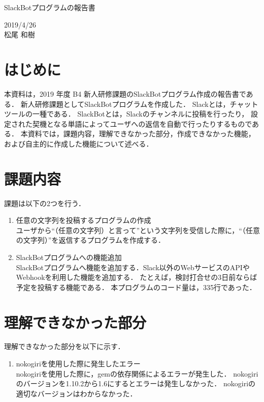 \documentclass[12pt]{jsarticle}
\begin{document}
\begin{center}
{\LARGE SlackBotプログラムの報告書}
\end{center}

\begin{flushright}
  2019/4/26\\
  松尾 和樹
\end{flushright}
\section{はじめに}
\label{sec:introduction}
本資料は，2019 年度 B4 新人研修課題のSlackBotプログラム作成の報告書である．
新人研修課題としてSlackBotプログラムを作成した．
Slack\cite{slack}とは，チャットツールの一種である．
SlackBotとは，Slackのチャンネルに投稿を行ったり，
設定された契機となる単語によってユーザへの返信を自動で行ったりするものである．
本資料では，課題内容，理解できなかった部分，作成できなかった機能，および自主的に作成した機能について述べる．

\section{課題内容}
課題は以下の2つを行う．
\begin{enumerate}
\item 任意の文字列を投稿するプログラムの作成\\
ユーザから``（任意の文字列）と言って''という文字列を受信した際に，``（任意の文字列）''を返信するプログラムを作成する．
\item SlackBotプログラムへの機能追加\\
SlackBotプログラムへ機能を追加する．Slack以外のWebサービスのAPIやWebhookを利用した機能を追加する．
たとえば，検討打合せの3日前ならば予定を投稿する機能である．
本プログラムのコード量は，335行であった．
\end{enumerate}

\section{理解できなかった部分}
理解できなかった部分を以下に示す．
\begin{enumerate}
\item nokogiriを使用した際に発生したエラー\\
nokogiriを使用した際に，gemの依存関係によるエラーが発生した．
nokogiriのバージョンを1.10.2から1.6にするとエラーは発生しなかった．
nokogiriの適切なバージョンはわからなかった．
\end{enumerate}
\end{document}
